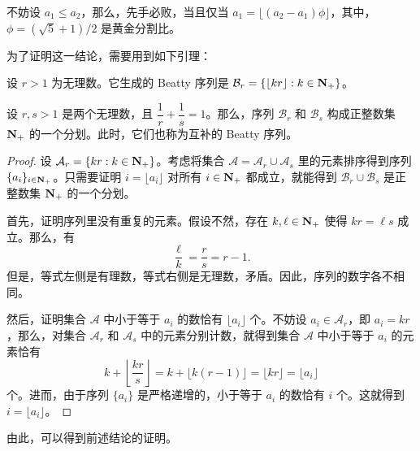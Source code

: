 \begin{theorem}
	不妨设 $a_1\le a_2$，那么，先手必败，当且仅当 $a_1 = \lfloor(a_2-a_1)\phi\rfloor$，其中，$\phi=(\sqrt{5}+1)/2$ 是黄金分割比。
\end{theorem}

为了证明这一结论，需要用到如下引理：

\begin{definition}[Beatty 序列]
	设 $r > 1$ 为无理数。它生成的 Beatty 序列是 $\mathcal B_r = \{\lfloor kr\rfloor : k \in\mathbf{N}_+\}$。
\end{definition}

\begin{lemma}[Rayleigh 定理]
	设 $r,s > 1$ 是两个无理数，且 $\dfrac{1}{r}+\dfrac{1}{s}=1$。那么，序列 $\mathcal B_r$ 和 $\mathcal B_s$ 构成正整数集 $\mathbf{N}_+$ 的一个分划。此时，它们也称为互补的 Beatty 序列。
\end{lemma}

\begin{proof}
	设 $\mathcal A_r=\{kr:k\in\mathbf{N}_+\}$。考虑将集合 $\mathcal A=\mathcal A_r\cup\mathcal A_s$ 里的元素排序得到序列 $\{a_i\}_{i\in\mathbf{N}_+}$。只需要证明 $i=\lfloor a_i\rfloor$ 对所有 $i\in\mathbf{N}_+$ 都成立，就能得到 $\mathcal B_r\cup\mathcal B_s$ 是正整数集 $\mathbf{N}_+$ 的一个分划。
	
	首先，证明序列里没有重复的元素。假设不然，存在 $k,\ell\in\mathbf{N}_+$ 使得 $kr=\ell s$ 成立。那么，有
	$$
	\dfrac{\ell}{k} = \dfrac{r}{s} = r - 1.
	$$
	但是，等式左侧是有理数，等式右侧是无理数，矛盾。因此，序列的数字各不相同。
	
	然后，证明集合 $\mathcal A$ 中小于等于 $a_i$ 的数恰有 $\lfloor a_i\rfloor$ 个。不妨设 $a_i\in\mathcal A_r$，即 $a_i=kr$，那么，对集合 $\mathcal A_r$ 和 $\mathcal A_s$ 中的元素分别计数，就得到集合 $\mathcal A$ 中小于等于 $a_i$ 的元素恰有
	$$
	k + \left\lfloor\dfrac{kr}{s}\right\rfloor = k + \lfloor k(r-1)\rfloor = \lfloor kr\rfloor = \lfloor a_i\rfloor
	$$
	个。进而，由于序列 $\{a_i\}$ 是严格递增的，小于等于 $a_i$ 的数恰有 $i$ 个。这就得到 $i=\lfloor a_i\rfloor$。
\end{proof}

由此，可以得到前述结论的证明。


